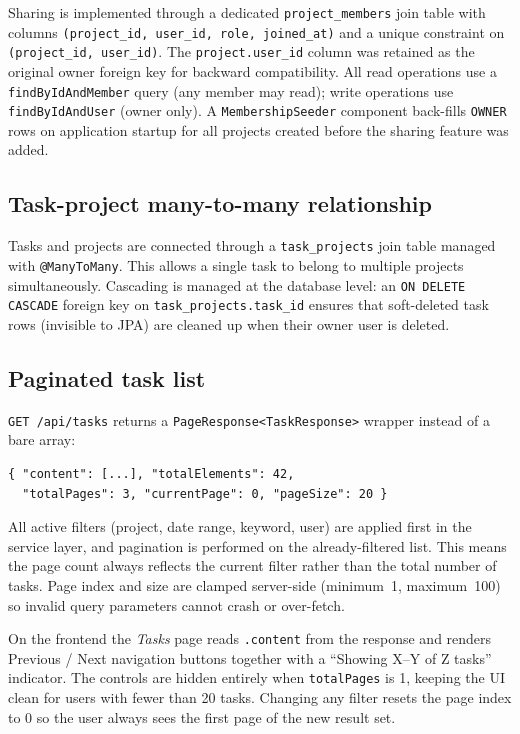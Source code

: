 \documentclass[a4paper, 12pt]{article}
\begin{document}
Sharing is implemented through a dedicated \texttt{project\_members} join table with columns
\texttt{(project\_id, user\_id, role, joined\_at)} and a unique constraint on
\texttt{(project\_id, user\_id)}. The \texttt{project.user\_id} column was retained as the
original owner foreign key for backward compatibility. All read operations use a
\texttt{findByIdAndMember} query (any member may read); write operations use
\texttt{findByIdAndUser} (owner only). A \texttt{MembershipSeeder} component back-fills
\texttt{OWNER} rows on application startup for all projects created before the sharing feature
was added.

\subsection{Task-project many-to-many relationship}

Tasks and projects are connected through a \texttt{task\_projects} join table managed with
\texttt{@ManyToMany}. This allows a single task to belong to multiple projects simultaneously.
Cascading is managed at the database level: an \texttt{ON DELETE CASCADE} foreign key on
\texttt{task\_projects.task\_id} ensures that soft-deleted task rows (invisible to JPA) are
cleaned up when their owner user is deleted.

\subsection{Paginated task list}

\texttt{GET /api/tasks} returns a \texttt{PageResponse<TaskResponse>} wrapper instead of a
bare array:

\begin{verbatim}
{ "content": [...], "totalElements": 42,
  "totalPages": 3, "currentPage": 0, "pageSize": 20 }
\end{verbatim}

All active filters (project, date range, keyword, user) are applied first in the service
layer, and pagination is performed on the already-filtered list. This means the page count
always reflects the current filter rather than the total number of tasks. Page index and
size are clamped server-side (minimum~1, maximum~100) so invalid query parameters cannot
crash or over-fetch.

On the frontend the \textit{Tasks} page reads \texttt{.content} from the response and renders
Previous / Next navigation buttons together with a ``Showing X--Y of Z tasks'' indicator.
The controls are hidden entirely when \texttt{totalPages} is 1, keeping the UI clean for
users with fewer than 20 tasks. Changing any filter resets the page index to 0 so the user
always sees the first page of the new result set.
\end{document}
